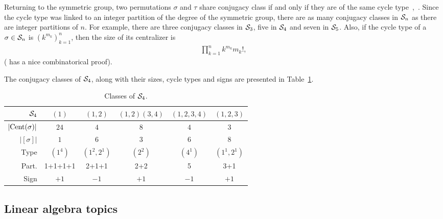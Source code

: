 Returning to the symmetric group, two permutations $\sigma$ and $\tau$ share conjugacy class if and only if they are of the same cycle type~\cite[Sect.1.1.]{Sagan},~\cite[??]{Biggs}. Since the cycle type was linked to an integer partition of the degree of the symmetric group, there are as many conjugacy classes in $\mathcal{S}_n$ as there are integer partitions of $n$. For example, there are three conjugacy classes in $\mathcal{S}_3$, five in $\Sym_4$ and seven in $\mathcal{S}_5$. Also, if the cycle type of a $\sigma \in \mathcal{S}_n$ is $(k^{m_k})_{k=1}^n$, then the size of its centralizer is 
\begin{align*}
	\prod_{k=1}^{n} k^{m_k} m_k!,
\end{align*}
(\cite[Prop.1.1.1.]{Sagan} has a nice combinatorical proof).

\begin{example}[$\Sym_4$]
	The conjugacy classes of $\Sym_4$, along with their sizes, cycle types and signs are presented in Table~\ref{table:elementsSym4}.
	\begin{table}[hbt!]
		\centering
		\begin{tabular}{r | c c c c c}
			         $\Sym_4$ & $(1)$   & $(1,2)$     & $(1,2)(3,4)$ & $(1,2,3,4)$ & $(1,2,3)$   \\ \hline
			$|\text{Cent}(\sigma)|$ & $24$    & $4$         & $8$          & $4$         & $3$         \\
			     $|[\sigma]|$ & $1$     & $6$         & $3$          & $6$         & $8$         \\
			             Type & $(1^4)$ & $(1^2,2^1)$ & $(2^2)$      & $(4^1)$     & $(1^1,2^1)$ \\
			            Part. & 1+1+1+1 & 2+1+1       & 2+2          & 5           & 3+1         \\
			             Sign & $+1$    & $-1$        & $+1$         & $-1$& $+1$        
		\end{tabular}
		\caption{Classes of $\Sym_4$.}
		\label{table:elementsSym4}
	\end{table}
\end{example}


\subsection{Linear algebra topics}

	
